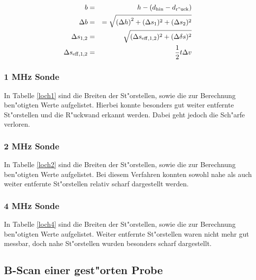 \begin{eqnarray*}
	b &=& h - (d_\mathrm{hin} - d_\mathrm{r"uck})\\
	\Delta  b &=& = \sqrt{\left(\Delta h \right)^2 + (\Delta s_\mathrm{1})^2 + (\Delta s_\mathrm{2})^2}\\
	\Delta s_\mathrm{1,2} &=& \sqrt{(\Delta s_\mathrm{eff,1,2})^2 + (\Delta \delta s)^2}\\
	\Delta s_\mathrm{eff,1,2} &=& \frac{1}{2} t \Delta v
\end{eqnarray*}

\subsubsection{1 MHz Sonde} %
\label{sub:1_mhz_sonde}



In Tabelle \ref{loch1} sind die Breiten der St"orstellen, sowie die zur Berechnung ben"otigten Werte aufgelistet. Hierbei konnte besonders gut weiter entfernte St"orstellen und die R"uckwand erkannt werden. Dabei geht jedoch die Sch"arfe verloren.

\clearpage
\subsubsection{2 MHz Sonde} %
\label{sub:1_mhz_sonde}



In Tabelle \ref{loch2} sind die Breiten der St"orstellen, sowie die zur Berechnung ben"otigten Werte aufgelistet. Bei diesem Verfahren konnten sowohl nahe als auch weiter entfernte St"orstellen relativ scharf dargestellt werden.

\clearpage
\subsubsection{4 MHz Sonde} %
\label{sub:1_mhz_sonde}



In Tabelle \ref{loch4} sind die Breiten der St"orstellen, sowie die zur Berechnung ben"otigten Werte aufgelistet. Weiter entfernte St"orstellen waren nicht mehr gut messbar, doch nahe St"orstellen wurden besonders scharf dargestellt.

\clearpage

\subsection{B-Scan einer gest"orten Probe} %
\label{sub:b_scan_einer_gest_orten_probe}

